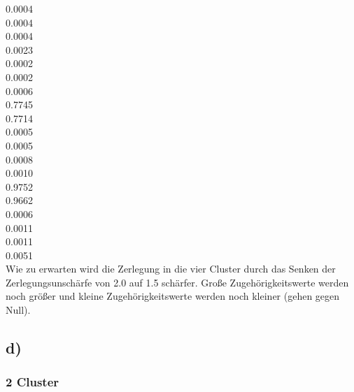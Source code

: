 0.0004      \\
0.0004      \\
0.0004      \\
0.0023      \\
0.0002      \\
0.0002      \\
0.0006      \\
0.7745      \\
0.7714      \\
0.0005      \\
0.0005      \\
0.0008      \\
0.0010      \\
0.9752      \\
0.9662      \\
0.0006      \\
0.0011      \\
0.0011      \\
0.0051      \\

Wie zu erwarten wird die Zerlegung in die vier Cluster durch das Senken der Zerlegungsunschärfe von 2.0 auf 1.5 schärfer. Große Zugehörigkeitswerte werden noch größer und kleine Zugehörigkeitswerte werden noch kleiner (gehen gegen Null).


\subsection*{d)}

\subsubsection*{2 Cluster}

